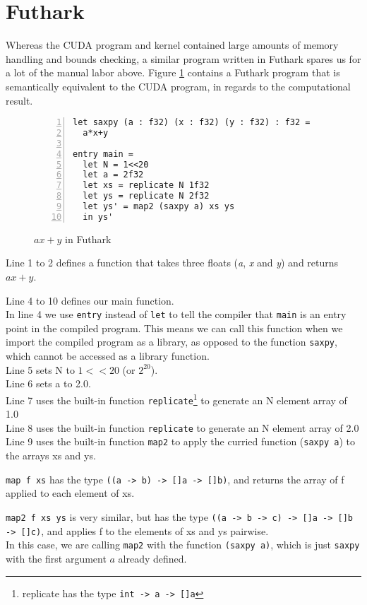 \section{Futhark}
Whereas the CUDA program and kernel contained large amounts of memory handling
and bounds checking, a similar program written in Futhark spares us for a lot of
the manual labor above. Figure \ref{fig:futsaxpy} contains a Futhark program
that is semantically equivalent to the CUDA program, in regards to the
computational result.
\begin{figure}[H]
  \centering
\begin{lstlisting}[language=Futhark, numbers=left]
let saxpy (a : f32) (x : f32) (y : f32) : f32 =
  a*x+y

entry main =
  let N = 1<<20
  let a = 2f32
  let xs = replicate N 1f32
  let ys = replicate N 2f32
  let ys' = map2 (saxpy a) xs ys
  in ys'
  \end{lstlisting}
  \caption{$ax+y$ in Futhark}
  \label{fig:futsaxpy}
\end{figure}

Line 1 to 2 defines a function that takes three floats (\textit{a}, \textit{x}
and \textit{y}) and returns $ax+y$.  

Line 4 to 10 defines our main function.\\
In line 4 we use \texttt{entry} instead of \texttt{let} to tell the compiler
that \texttt{main} is an entry point in the compiled program. This means we can
call this function when we import the compiled program as a library, as opposed
to the function \texttt{saxpy}, which cannot be accessed as a library function.\\
Line 5 sets N to $1 << 20$ (or $2^{20}$).\\
Line 6 sets a to 2.0.\\
Line 7 uses the built-in function \texttt{replicate}\footnote{replicate has the
  type \texttt{int -> a -> []a}} to generate an N element
array of 1.0\\
Line 8 uses the built-in function \texttt{replicate} to generate an N element array of 2.0\\
Line 9 uses the built-in function \texttt{map2} to apply the curried function
(\texttt{saxpy a}) to the arrays xs and ys.

\texttt{map f xs} has the type \texttt{((a -> b) -> []a -> []b)}, and
returns the array of f applied to each element of xs.

\texttt{map2 f xs ys} is very similar, but has the type \texttt{((a -> b -> c) -> []a -> []b -> []c)}, and
applies f to the elements of xs and ys pairwise.\\
In this case, we are calling \texttt{map2} with the function \texttt{(saxpy a)},
which is just \texttt{saxpy} with the first argument $a$ already defined.

